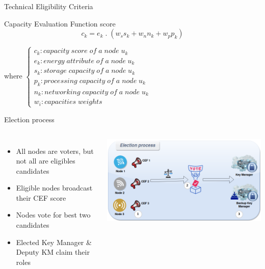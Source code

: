 \documentclass{beamer}
\begin{document}
\begin{frame}{Technical Eligibility Criteria}
	\begin{exampleblock}{Capacity Evaluation Function score}
		\begin{equation*}
			c_k = e_k \; .\; \left( w_s s_k + w_n n_k +  w_p p_k \right)
		\end{equation*}
	\end{exampleblock}
	\vfill
	where
	\begin{math}
		\left\{
		\begin{array}{l}
			c_k: capacity\; score\; of\; a\; node\; u_k\\
			e_k: energy\; attribute\; of\; a\; node\; u_k\\
			s_k: storage\; capacity\; of\; a\; node\; u_k\\
			p_k: processing\; capacity\; of\; a\; node\; u_k\\
			n_k: networking\; capacity\; of\; a\; node\; u_k\\
			w_i: capacities\; weights
		\end{array}
		\right.
	\end{math}
\end{frame}

\begin{frame}{Election process}
	\begin{columns}
		\begin{itemize}
			\item All nodes are voters, but not all are eligibles candidates
			\item Eligible nodes broadcast their CEF score
			\item Nodes vote for best two candidates
			\item Elected Key Manager \& Deputy KM claim their roles
		\end{itemize}
		\includegraphics[width=\linewidth]{figures/election.png}
	\end{columns}
\end{frame}
\end{document}
